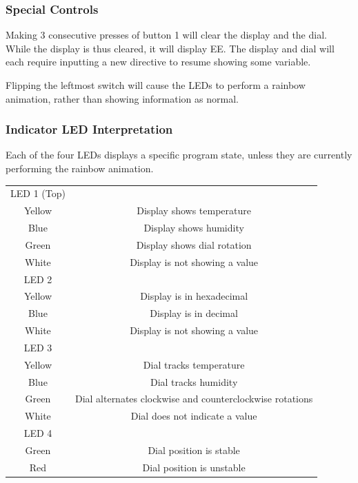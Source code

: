 \documentclass[12pt]{amsart}
\begin{document}
\subsubsection{Special Controls}

Making 3 consecutive presses of button 1 will clear the display and the dial.
While the display is thus cleared, it will display EE. The display and dial will
each require inputting a new directive to resume showing some variable.

Flipping the leftmost switch will cause the LEDs to perform a rainbow animation, rather than
showing information as normal.

\subsubsection{Indicator LED Interpretation}

Each of the four LEDs displays a specific program state, unless they are currently performing the
rainbow animation.

\begin{center}
    \begin{tabular}{c c}
        \hline
        LED 1 (Top) & \\
        Yellow & Display shows temperature \\
        Blue & Display shows humidity \\
        Green & Display shows dial rotation \\
        White & Display is not showing a value \\
        \hline
        LED 2 & \\
        Yellow & Display is in hexadecimal \\
        Blue & Display is in decimal \\
        White & Display is not showing a value \\
        \hline
        LED 3 & \\ 
        Yellow & Dial tracks temperature \\
        Blue & Dial tracks humidity \\
        Green & Dial alternates clockwise and counterclockwise rotations \\
        White & Dial does not indicate a value \\
        \hline
        LED 4 & \\
        Green & Dial position is stable \\
        Red & Dial position is unstable \\
    \end{tabular}
\end{center}
\end{document}
